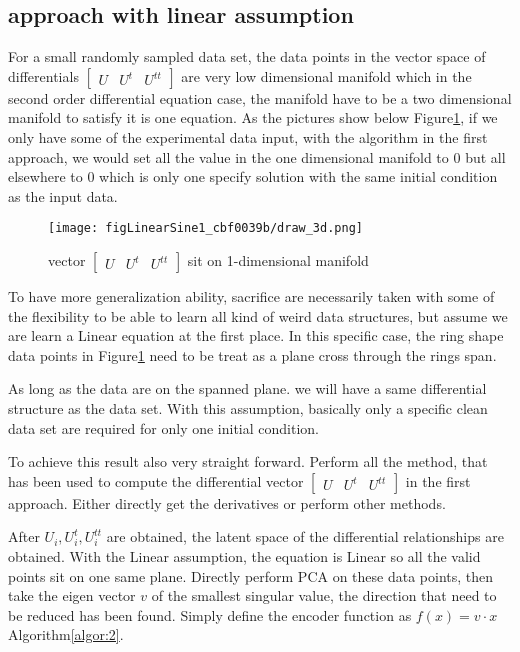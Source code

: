 \documentclass{article}
\begin{document}
\subsection{approach with linear assumption}
For a small randomly sampled data set, the data points
in the vector space of differentials
$\left[\begin{matrix}{U}&{U^{t}}&{U^{tt}}\end{matrix}\right]$
are very low dimensional manifold which in the second order
differential equation case, the manifold have to be a two dimensional
manifold to satisfy it is one equation. As the pictures show below Figure\ref{one:dimensionalmani},
if we only have some of the experimental data input, with
the algorithm in the first approach, we would set all the
value in the one dimensional manifold to $0$ but all elsewhere
to $0$ which is only one specify solution with the same
initial condition as the input data.
\begin{figure}[ht!]
    \centering
    \texttt{[image: figLinearSine1\_cbf0039b/draw\_3d.png]}
    \caption{vector $\left[\begin{matrix}{U}&{U^{t}}&{U^{tt}}\end{matrix}\right]$ sit on 1-dimensional manifold}
    \label{one:dimensionalmani}
\end{figure}
To have more generalization ability, sacrifice
are necessarily taken with some of the flexibility
to be able to learn all kind of weird data structures,
but assume we are learn a Linear equation at the first place.
In this specific case, the ring shape data points in Figure\ref{one:dimensionalmani}
need to be treat as a plane cross through the rings span.

As long as the data are on the spanned plane. we will have
a same differential structure as the data set.
With this assumption, basically only a specific clean data
set are required for only one initial condition.

To achieve this result also very straight forward.
Perform all the method, that has been used to compute the differential vector
$\left[\begin{matrix}{U}&{U^{t}}&{U^{tt}}\end{matrix}\right]$
in the first approach. Either directly get the derivatives or
perform other methods.

After $U_i, U^{t}_{i}, U^{tt}_{i}$ are obtained, the
latent space of the differential relationships are obtained.
With the Linear assumption, the equation is Linear so all the
valid points sit on one same plane. Directly perform PCA on
these data points, then take the eigen vector $v$ of the
smallest singular value, the direction that need to be reduced
has been found. Simply define the encoder function as
$f(x)=v \cdot x$ Algorithm\ref{algor:2}.
\end{document}
